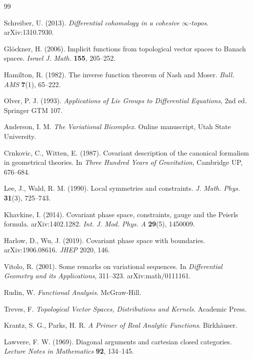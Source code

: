 \documentclass[12pt,a4paper]{article}
\theoremstyle{definition}
\begin{document}

\begin{thebibliography}{99}

Schreiber, U. (2013). \emph{Differential cohomology in a cohesive $\infty$-topos}. arXiv:1310.7930.

Gl\"ockner, H. (2006). Implicit functions from topological vector spaces to Banach spaces. \emph{Israel J. Math.} \textbf{155}, 205--252.

Hamilton, R. (1982). The inverse function theorem of Nash and Moser. \emph{Bull. AMS} \textbf{7}(1), 65--222.

Olver, P. J. (1993). \emph{Applications of Lie Groups to Differential Equations}, 2nd ed. Springer GTM 107.

Anderson, I. M. \emph{The Variational Bicomplex}. Online manuscript, Utah State University.

Crnkovic, C., Witten, E. (1987). Covariant description of the canonical formalism in geometrical theories. In \emph{Three Hundred Years of Gravitation}, Cambridge UP, 676--684.

Lee, J., Wald, R. M. (1990). Local symmetries and constraints. \emph{J. Math. Phys.} \textbf{31}(3), 725--743.

Khavkine, I. (2014). Covariant phase space, constraints, gauge and the Peierls formula. arXiv:1402.1282. \emph{Int. J. Mod. Phys. A} \textbf{29}(5), 1450009.

Harlow, D., Wu, J. (2019). Covariant phase space with boundaries. arXiv:1906.08616. \emph{JHEP} 2020, 146.

Vitolo, R. (2001). Some remarks on variational sequences. In \emph{Differential Geometry and its Applications}, 311--323. arXiv:math/0111161.

Rudin, W. \emph{Functional Analysis}. McGraw-Hill.

Treves, F. \emph{Topological Vector Spaces, Distributions and Kernels}. Academic Press.

Krantz, S. G., Parks, H. R. \emph{A Primer of Real Analytic Functions}. Birkh\"auser.

Lawvere, F. W. (1969). Diagonal arguments and cartesian closed categories. \emph{Lecture Notes in Mathematics} \textbf{92}, 134--145.


\end{thebibliography}
\end{document}
